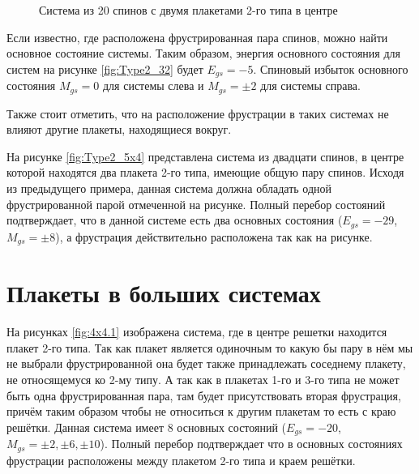 \documentclass[utf8, babel, sor, jor, amsmath, amssymb, reprint]{elsarticle} %
\begin{document}
\begin{figure}[H]
\begin{minipage}{0.3\textwidth}
	\caption{Система из 20 спинов с двумя плакетами 2-го типа в центре}
	\label{fig:Type2_5x4}
\end{minipage}
\end{figure}


Если известно, где расположена фрустрированная пара спинов, можно найти основное состояние системы. Таким образом, энергия основного состояния для систем на рисунке \ref{fig:Type2_32} будет $E_{gs}=-5$. Спиновый избыток основного состояния $M_{gs}=0$ для системы слева и $M_{gs}=\pm 2$ для системы справа.

Также стоит отметить, что на расположение фрустрации в таких системах  не влияют другие плакеты, находящиеся вокруг.

На рисунке \eqref{fig:Type2_5x4} представлена система из двадцати спинов, в центре которой находятся два плакета 2-го типа, имеющие общую пару спинов. Исходя из предыдущего примера, данная система должна обладать одной фрустрированной парой отмеченной на рисунке. Полный перебор состояний подтверждает, что в данной системе есть два основных состояния ($E_{gs}=-29$, $M_{gs}=\pm 8$), а фрустрация действительно расположена так как на рисунке.

\section{Плакеты в больших системах}

На рисунках \ref{fig:4x4.1} изображена система, где в центре решетки находится плакет 2-го типа. Так как плакет является одиночным то какую бы пару в нём мы не выбрали фрустрированной она будет также принадлежать соседнему плакету, не относящемуся ко 2-му типу. А так как в плакетах 1-го и 3-го типа не может быть одна фрустрированная пара, там будет присутствовать вторая фрустрация, причём таким образом чтобы не относиться к другим плакетам то есть с краю решётки. Данная система имеет 8 основных состояний ($E_{gs}=-20$, $M_{gs}=\pm 2, \pm 6, \pm 10$). Полный перебор подтверждает что в основных состояниях фрустрации расположены между плакетом 2-го типа и краем решётки.
\end{document}
